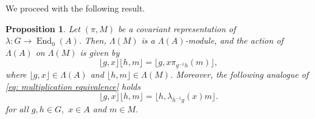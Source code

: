 \documentclass[11pt]{amsart}
\numberwithin{equation}{section}
\newtheorem{proposition}[theorem]{Proposition}
\theoremstyle{definition}
\theoremstyle{remark}
\begin{document}
We proceed with the following result.
\begin{proposition}\label{p: Lambda preserve covariant representations}
    Let \((\pi, M)\) be a covariant representation of \(\lambda: G \to \operatorname{End}_0(A)\).
    Then, \(\Lambda(M)\) is a \(\Lambda(A)\)-module, and the action of \(\Lambda(A)\) on \(\Lambda(M)\) is given by
    \[
        \lfloor g, x \rfloor \lfloor h, m \rfloor = \lfloor g, x \pi_{g^{-1}h}(m) \rfloor,
    \]
    where \(\lfloor g, x \rfloor \in \Lambda(A)\) and \(\lfloor h, m \rfloor \in \Lambda(M)\).
    Moreover, the following analogue of  \eqref{eq: multiplication equivalence} holds 
    \begin{equation}\label{eq:Analogue}
    \lfloor g, x \rfloor \lfloor h, m \rfloor =  \lfloor h, \lambda_{h^{-1}g}(x) m \rfloor.
\end{equation}  for all $g,h\in G,$ $x\in A$ and $m\in M.$ 
\end{proposition}
\end{document}
